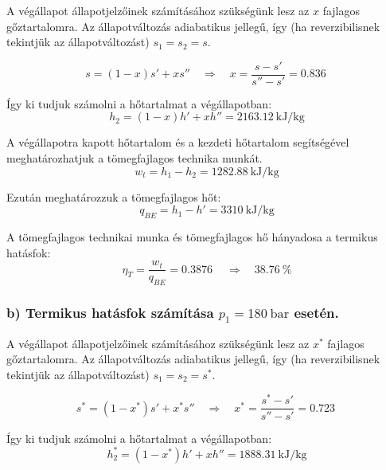 A végállapot állapotjelzőinek számításához szükségünk lesz az $x$ fajlagos gőztartalomra. Az állapotváltozás adiabatikus jellegű, így (ha reverzibilisnek tekintjük az állapotváltozást) $s_1 = s_2 = s $.

\begin{equation}
	s = \left(1 - x\right) s' + x s''
	\quad 
	\Rightarrow
	\quad 
	x =	\dfrac{s - s'}{s'' - s'} = \SI{0,836}{}
\end{equation}


\noindent Így ki tudjuk számolni a hőtartalmat a végállapotban:
\begin{equation}
	h_2 = \left(1 - x\right) h' + x h'' = \SI{2163,12}{\kilo\joule\per\kilogram}
\end{equation}

\noindent A végállapotra kapott hőtartalom és a kezdeti hőtartalom segítségével meghatározhatjuk a tömegfajlagos technika munkát.
\begin{equation}
	w_t = h_1 - h_2 = \SI{1282,88}{\kilo\joule\per\kilogram}
\end{equation}

\noindent Ezután meghatározzuk a tömegfajlagos hőt:
\begin{equation}
	q_{BE} = h_1 - h' = \SI{3310}{\kilo\joule\per\kilogram}
\end{equation}


\noindent A tömegfajlagos technikai munka és tömegfajlagos hő hányadosa a termikus hatásfok:
\begin{equation}
	\eta_{T} = \dfrac{w_t}{q_{BE}} = \SI{0,3876}{}
		\quad 
	\Rightarrow
	\quad 
	\SI{38,76}{\percent}
\end{equation}

\subsubsection*{b) Termikus hatásfok számítása $p_1=\SI{180}{\bar}$ esetén.}

A végállapot állapotjelzőinek számításához szükségünk lesz az $x^*$ fajlagos gőztartalomra. Az állapotváltozás adiabatikus jellegű, így (ha reverzibilisnek tekintjük az állapotváltozást) $s_1 = s_2 = s^* $.

\begin{equation}
s^* = \left(1 - x^*\right) s' + x^* s''
\quad 
\Rightarrow
\quad 
x^* =	\dfrac{s^* - s'}{s'' - s'} = \SI{0,723}{}
\end{equation}


\noindent Így ki tudjuk számolni a hőtartalmat a végállapotban:
\begin{equation}
h_2^* = \left(1 - x^*\right) h' + x h'' = \SI{1888,31}{\kilo\joule\per\kilogram}
\end{equation}

